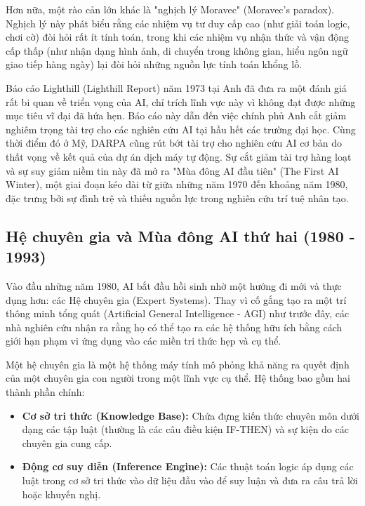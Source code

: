 Hơn nữa, một rào cản lớn khác là "nghịch lý Moravec" (Moravec's paradox). Nghịch lý này phát biểu rằng các nhiệm vụ tư duy cấp cao (như giải toán logic, chơi cờ) đòi hỏi rất ít tính toán, trong khi các nhiệm vụ nhận thức và vận động cấp thấp (như nhận dạng hình ảnh, di chuyển trong không gian, hiểu ngôn ngữ giao tiếp hàng ngày) lại đòi hỏi những nguồn lực tính toán khổng lồ. 

Báo cáo Lighthill (Lighthill Report) năm 1973 tại Anh đã đưa ra một đánh giá rất bi quan về triển vọng của AI, chỉ trích lĩnh vực này vì không đạt được những mục tiêu vĩ đại đã hứa hẹn. Báo cáo này dẫn đến việc chính phủ Anh cắt giảm nghiêm trọng tài trợ cho các nghiên cứu AI tại hầu hết các trường đại học. Cùng thời điểm đó ở Mỹ, DARPA cũng rút bớt tài trợ cho nghiên cứu AI cơ bản do thất vọng về kết quả của dự án dịch máy tự động. Sự cắt giảm tài trợ hàng loạt và sự suy giảm niềm tin này đã mở ra "Mùa đông AI đầu tiên" (The First AI Winter), một giai đoạn kéo dài từ giữa những năm 1970 đến khoảng năm 1980, đặc trưng bởi sự đình trệ và thiếu nguồn lực trong nghiên cứu trí tuệ nhân tạo.

\newpage

\subsection{Hệ chuyên gia và Mùa đông AI thứ hai (1980 - 1993)}

Vào đầu những năm 1980, AI bắt đầu hồi sinh nhờ một hướng đi mới và thực dụng hơn: các Hệ chuyên gia (Expert Systems). Thay vì cố gắng tạo ra một trí thông minh tổng quát (Artificial General Intelligence - AGI) như trước đây, các nhà nghiên cứu nhận ra rằng họ có thể tạo ra các hệ thống hữu ích bằng cách giới hạn phạm vi ứng dụng vào các miền tri thức hẹp và cụ thể.

Một hệ chuyên gia là một hệ thống máy tính mô phỏng khả năng ra quyết định của một chuyên gia con người trong một lĩnh vực cụ thể. Hệ thống bao gồm hai thành phần chính:
\begin{itemize}
    \item \textbf{Cơ sở tri thức (Knowledge Base):} Chứa đựng kiến thức chuyên môn dưới dạng các tập luật (thường là các câu điều kiện IF-THEN) và sự kiện do các chuyên gia cung cấp.
    \item \textbf{Động cơ suy diễn (Inference Engine):} Các thuật toán logic áp dụng các luật trong cơ sở tri thức vào dữ liệu đầu vào để suy luận và đưa ra câu trả lời hoặc khuyến nghị.
\end{itemize}

